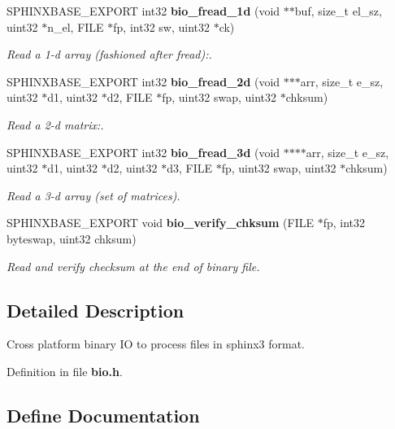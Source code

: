 \begin{CompactItemize}
SPHINXBASE\_\-EXPORT int32 {\bf bio\_\-fread\_\-1d} (void $\ast$$\ast$buf, size\_\-t el\_\-sz, uint32 $\ast$n\_\-el, FILE $\ast$fp, int32 sw, uint32 $\ast$ck)
\begin{CompactList}\small\item\em Read a 1-d array (fashioned after fread):. \item\end{CompactList}\item 
SPHINXBASE\_\-EXPORT int32 {\bf bio\_\-fread\_\-2d} (void $\ast$$\ast$$\ast$arr, size\_\-t e\_\-sz, uint32 $\ast$d1, uint32 $\ast$d2, FILE $\ast$fp, uint32 swap, uint32 $\ast$chksum)
\begin{CompactList}\small\item\em Read a 2-d matrix:. \item\end{CompactList}\item 
SPHINXBASE\_\-EXPORT int32 {\bf bio\_\-fread\_\-3d} (void $\ast$$\ast$$\ast$$\ast$arr, size\_\-t e\_\-sz, uint32 $\ast$d1, uint32 $\ast$d2, uint32 $\ast$d3, FILE $\ast$fp, uint32 swap, uint32 $\ast$chksum)
\begin{CompactList}\small\item\em Read a 3-d array (set of matrices). \item\end{CompactList}\item 
SPHINXBASE\_\-EXPORT void {\bf bio\_\-verify\_\-chksum} (FILE $\ast$fp, int32 byteswap, uint32 chksum)
\begin{CompactList}\small\item\em Read and verify checksum at the end of binary file. \item\end{CompactList}\end{CompactItemize}


\subsection{Detailed Description}
Cross platform binary IO to process files in sphinx3 format. 



Definition in file {\bf bio.h}.

\subsection{Define Documentation}
